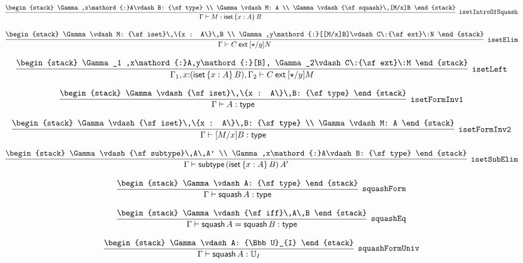 \[
\infer[{\tt isetIntroOfSquash}]{\Gamma \vdash M: {\sf iset}\,\{x : A\}\,B}{
\begin{stack}
\Gamma ,x\mathord{:}A\vdash B: {\sf type}
\\
\Gamma \vdash M: A
\\
\Gamma \vdash {\sf squash}\,[M/x]B
\end{stack}}
\]

\[
\infer[{\tt isetElim}]{\Gamma \vdash C\:{\sf ext}\:[\star /y]N}{
\begin{stack}
\Gamma \vdash M: {\sf iset}\,\{x : A\}\,B
\\
\Gamma ,y\mathord{:}[[M/x]B]\vdash C\:{\sf ext}\:N
\end{stack}}
\]

\[
\infer[{\tt isetLeft}]{\Gamma_1 ,x\mathord{:}({\sf iset}\,\{x : A\}\,B), \Gamma_2 \vdash C\:{\sf ext}\:[\star /y]M}{
\begin{stack}
\Gamma_1 ,x\mathord{:}A,y\mathord{:}[B], \Gamma_2\vdash C\:{\sf ext}\:M
\end{stack}}
\]

\[
\infer[{\tt isetFormInv1}]{\Gamma \vdash A: {\sf type}}{
\begin{stack}
\Gamma \vdash {\sf iset}\,\{x : A\}\,B: {\sf type}
\end{stack}}
\]

\[
\infer[{\tt isetFormInv2}]{\Gamma \vdash [M/x]B: {\sf type}}{
\begin{stack}
\Gamma \vdash {\sf iset}\,\{x : A\}\,B: {\sf type}
\\
\Gamma \vdash M: A
\end{stack}}
\]

\[
\infer[{\tt isetSubElim}]{\Gamma \vdash {\sf subtype}\,({\sf iset}\,\{x : A\}\,B)\,A'}{
\begin{stack}
\Gamma \vdash {\sf subtype}\,A\,A'
\\
\Gamma ,x\mathord{:}A\vdash B: {\sf type}
\end{stack}}
\]

\[
\infer[{\tt squashForm}]{\Gamma \vdash {\sf squash}\,A: {\sf type}}{
\begin{stack}
\Gamma \vdash A: {\sf type}
\end{stack}}
\]

\[
\infer[{\tt squashEq}]{\Gamma \vdash {\sf squash}\,A= {\sf squash}\,B: {\sf type}}{
\begin{stack}
\Gamma \vdash {\sf iff}\,A\,B
\end{stack}}
\]

\[
\infer[{\tt squashFormUniv}]{\Gamma \vdash {\sf squash}\,A: {\Bbb U}_{I}}{
\begin{stack}
\Gamma \vdash A: {\Bbb U}_{I}
\end{stack}}
\]

